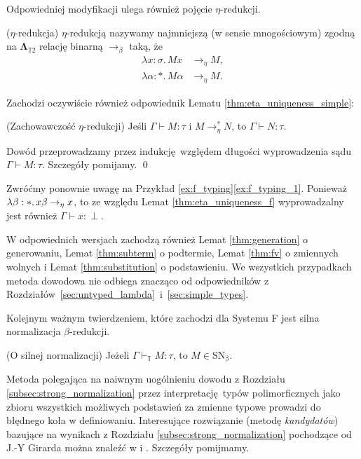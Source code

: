 Odpowiedniej modyfikacji ulega również pojęcie \(\eta\)-redukcji.
  \begin{definicja}(\(\eta\)-redukcja)
    \(\eta\)-redukcją nazywamy najmniejszą (w sensie mnogościowym) zgodną na \(\mathbf{\Lambda}_{\mathbb{T}2}\) relację binarną \(\to_\beta\) taką, że
  \begin{align*}
    \lambda x:\sigma.\,Mx &\to_\eta M,\\
    \lambda \alpha:*.\,M\alpha &\to_\eta M.
  \end{align*}
  \end{definicja}

Zachodzi oczywiście również odpowiednik Lematu \ref{thm:eta_uniqueness_simple}:
\begin{lemat}(Zachowawczość \(\eta\)-redukcji)\label{thm:eta_uniqueness_f}
  Jeśli \(\Gamma\vdash M:\tau\) i \(M\to^{*}_\eta N\), to \(\Gamma\vdash N:\tau\).
\end{lemat}
\begin{dowod}
  Dowód przeprowadzamy przez indukcję względem długości wyprowadzenia sądu \(\Gamma\vdash M:\tau\). Szczegóły pomijamy. \qed
\end{dowod}

\begin{przyklad} Zwróćmy ponownie uwagę na Przykład \ref{ex:f_typing}\ref{ex:f_typing_1}. Ponieważ \(\lambda \beta : *.\,x\beta\nobreak\to_\eta\nobreak x\), to ze względu Lemat \ref{thm:eta_uniqueness_f} wyprowadzalny jest również \(\Gamma\vdash x:\perp\).
\end{przyklad}

W odpowiednich wersjach zachodzą również Lemat \ref{thm:generation} o generowaniu, Lemat \ref{thm:subterm} o podtermie, Lemat \ref{thm:fv} o zmiennych wolnych i Lemat \ref{thm:substitution} o podstawieniu. We wszystkich przypadkach metoda dowodowa nie odbiega znacząco od odpowiedników z Rozdziałów~\ref{sec:untyped_lambda}~i~\ref{sec:simple_types}.

Kolejnym ważnym twierdzeniem, które zachodzi dla Systemu F jest silna normalizacja \(\beta\)-redukcji.

\begin{twierdzenie}(O silnej normalizacji)
  Jeżeli \(\Gamma\vdash_\mathbb{T}M:\tau\), to \(M\in\mathrm{SN_\beta}\).
\end{twierdzenie}
\begin{dowod}
  Metoda polegająca na naiwnym uogólnieniu dowodu z Rozdziału \ref{subsec:strong_normalization} przez interpretację typów polimorficznych jako zbioru wszystkich możliwych podstawień za zmienne typowe prowadzi do błędnego koła w definiowaniu. Interesujące rozwiązanie (metodę \emph{kandydatów}) bazujące na wynikach z Rozdziału \ref{subsec:strong_normalization} pochodzące od J.-Y Girarda można znaleźć w \cite[Rozdział 11.5]{Urzyczyn2006} i \cite[Rozdział 6]{Girard:1989:PT:64805}. Szczegóły pomijmamy.
\end{dowod}

